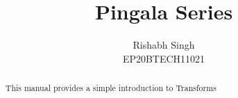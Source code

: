 \documentclass[journal,12pt,twocolumn]{IEEEtran}
\begin{document}
	\renewcommand{\thefigure}{\arabic{section}.\arabic{figure}}
	\makeatletter
	\makeatother
	
	
	\def\putbox#1#2#3{\makebox[0in][l]{\makebox[#1][l]{}\raisebox{\baselineskip}[0in][0in]{\raisebox{#2}[0in][0in]{#3}}}}
	\def\rightbox#1{\makebox[0in][r]{#1}}
	\def\centbox#1{\makebox[0in]{#1}}
	\def\topbox#1{\raisebox{-\baselineskip}[0in][0in]{#1}}
	\def\midbox#1{\raisebox{-0.5\baselineskip}[0in][0in]{#1}}
	
	\vspace{3cm}
	
	\title{ 
		Pingala Series
	}
	
	
	
	\author{Rishabh Singh\\EP20BTECH11021}
	
	\maketitle
	
	
	\tableofcontents
	
	\bigskip
	
	\begin{abstract}
		This manual provides a simple introduction to Transforms
	\end{abstract}
\end{document}
